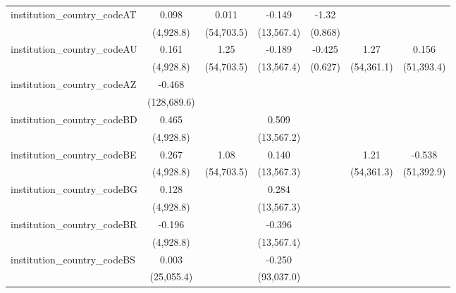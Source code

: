 \begin{tabular}{lcccccc}
   institution\_country\_codeAT          & 0.098         & 0.011       & -0.149        & -1.32        &              &   \\   
                                         & (4,928.8)     & (54,703.5)  & (13,567.4)    & (0.868)      &              &   \\   
   institution\_country\_codeAU          & 0.161         & 1.25        & -0.189        & -0.425       & 1.27         & 0.156\\   
                                         & (4,928.8)     & (54,703.5)  & (13,567.4)    & (0.627)      & (54,361.1)   & (51,393.4)\\   
   institution\_country\_codeAZ          & -0.468        &             &               &              &              &   \\   
                                         & (128,689.6)   &             &               &              &              &   \\   
   institution\_country\_codeBD          & 0.465         &             & 0.509         &              &              &   \\   
                                         & (4,928.8)     &             & (13,567.2)    &              &              &   \\   
   institution\_country\_codeBE          & 0.267         & 1.08        & 0.140         &              & 1.21         & -0.538\\   
                                         & (4,928.8)     & (54,703.5)  & (13,567.3)    &              & (54,361.3)   & (51,392.9)\\   
   institution\_country\_codeBG          & 0.128         &             & 0.284         &              &              &   \\   
                                         & (4,928.8)     &             & (13,567.3)    &              &              &   \\   
   institution\_country\_codeBR          & -0.196        &             & -0.396        &              &              &   \\   
                                         & (4,928.8)     &             & (13,567.4)    &              &              &   \\   
   institution\_country\_codeBS          & 0.003         &             & -0.250        &              &              &   \\   
                                         & (25,055.4)    &             & (93,037.0)    &              &              &   \\   

\end{tabular}
